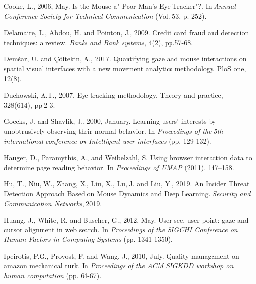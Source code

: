 \documentclass[12pt]{article}
\renewcommand{\_}{\kern-1.5pt\textunderscore\kern-1.5pt}
\begin{document}
\vspace{\baselineskip}
Cooke, L., 2006, May. Is the Mouse a" Poor Man's Eye Tracker"?. In \textit{Annual Conference-Society for Technical Communication} (Vol. 53, p. 252).\par


\vspace{\baselineskip}
Delamaire, L., Abdou, H. and Pointon, J., 2009. Credit card fraud and detection techniques: a review. \textit{Banks and Bank systems}, 4(2), pp.57-68.\par


\vspace{\baselineskip}
Demšar, U. and Çöltekin, A., 2017. Quantifying gaze and mouse interactions on spatial visual interfaces with a new movement analytics methodology. PloS one, 12(8).\par


\vspace{\baselineskip}
Duchowski, A.T., 2007. Eye tracking methodology. Theory and practice, 328(614), pp.2-3.\par


\vspace{\baselineskip}
Goecks, J. and Shavlik, J., 2000, January. Learning users' interests by unobtrusively observing their normal behavior. In \textit{Proceedings of the 5th international conference on Intelligent user interfaces} (pp. 129-132).\par


\vspace{\baselineskip}
Hauger, D., Paramythis, A., and Weibelzahl, S. Using browser interaction data to determine page reading behavior. In \textit{Proceedings of UMAP} (2011), 147–158.\par


\vspace{\baselineskip}
Hu, T., Niu, W., Zhang, X., Liu, X., Lu, J. and Liu, Y., 2019. An Insider Threat Detection Approach Based on Mouse Dynamics and Deep Learning. \textit{Security and Communication Networks}, 2019.\par


\vspace{\baselineskip}
Huang, J., White, R. and Buscher, G., 2012, May. User see, user point: gaze and cursor alignment in web search. In \textit{Proceedings of the SIGCHI Conference on Human Factors in Computing Systems} (pp. 1341-1350).\par


\vspace{\baselineskip}
Ipeirotis, P.G., Provost, F. and Wang, J., 2010, July. Quality management on amazon mechanical turk. In \textit{Proceedings of the ACM SIGKDD workshop on human computation} (pp. 64-67).\par
\end{document}
